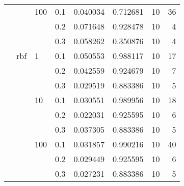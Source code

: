 \begin{table}[H]
\begin{tabular}{llllrrrr}
       &     & 100 & 0.1 &     0.040034 &  0.712681 &        10 &    36 \\
       &     &     & 0.2 &     0.071648 &  0.928478 &        10 &     4 \\
       &     &     & 0.3 &     0.058262 &  0.350876 &        10 &     4 \\
       & rbf & 1   & 0.1 &     0.050553 &  0.988117 &        10 &    17 \\
       &     &     & 0.2 &     0.042559 &  0.924679 &        10 &     7 \\
       &     &     & 0.3 &     0.029519 &  0.883386 &        10 &     5 \\
       &     & 10  & 0.1 &     0.030551 &  0.989956 &        10 &    18 \\
       &     &     & 0.2 &     0.022031 &  0.925595 &        10 &     6 \\
       &     &     & 0.3 &     0.037305 &  0.883386 &        10 &     5 \\
       &     & 100 & 0.1 &     0.031857 &  0.990216 &        10 &    40 \\
       &     &     & 0.2 &     0.029449 &  0.925595 &        10 &     6 \\
       &     &     & 0.3 &     0.027231 &  0.883386 &        10 &     5 \\
\bottomrule
\end{tabular}
\end{table}
